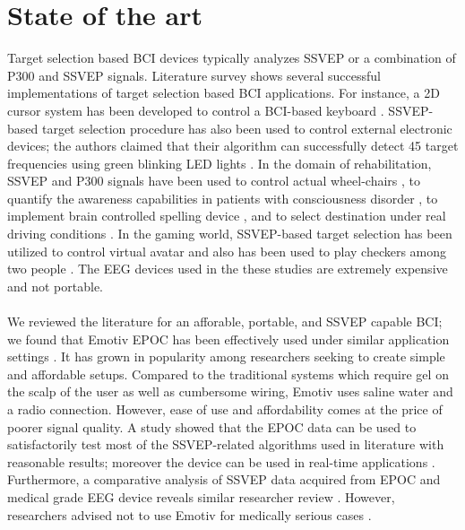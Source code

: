 \documentclass{svmult}
\begin{document}
\section{State of the art}
\label{sec:soa}
Target selection based BCI devices typically analyzes SSVEP or a combination of P300 and SSVEP signals. Literature survey shows several successful implementations of target selection based BCI applications. For instance, a 2D cursor system has been developed to control a BCI-based keyboard \cite{yin2015hybrid}. SSVEP-based target selection procedure has also been used to control external electronic devices; the authors claimed that their algorithm can successfully detect 45 target frequencies using green blinking LED lights \cite{SSVEPfiability}. In the domain of rehabilitation, SSVEP and P300 signals have been used to control actual wheel-chairs \cite{paper4}, to quantify the awareness capabilities in patients with consciousness disorder \cite{paper8}, to implement brain controlled spelling device \cite{paper2}, and to select destination under real driving conditions \cite{car}. In the gaming world, SSVEP-based target selection has been utilized to control virtual avatar \cite{paper_5} and also has been used to play checkers among two people \cite{paper6}. The EEG devices used in the these studies are extremely expensive and not portable.\\
\\
We reviewed the literature for an afforable, portable, and SSVEP capable BCI; we found that Emotiv EPOC has been effectively used under similar application settings \cite{jian2014improving, van2012designing}. It has grown in popularity among researchers seeking to create simple and affordable setups. 
Compared to the traditional systems which require gel on the scalp of the user as well as cumbersome wiring, Emotiv uses saline water and a radio connection. However, ease of use and affordability comes at the price of poorer signal quality. 
A study showed that the EPOC data can be used to satisfactorily test most of the SSVEP-related algorithms used in literature with reasonable results; moreover the device can be used in real-time applications \cite{hvaring2014comparison}. Furthermore, a comparative analysis of SSVEP data acquired from EPOC and medical grade EEG device reveals similar researcher review \cite{liu2012implementation}. However, researchers advised not to use Emotiv for medically serious cases \cite{duvinage2013performance}.\\
\\
\end{document}
